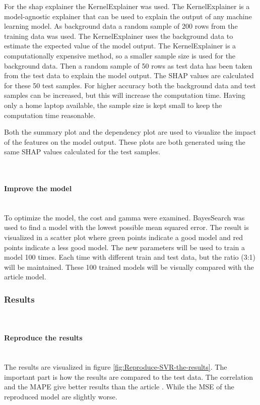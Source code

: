 \documentclass{article}
\newcommand{\subsubsubsection}[1]{%
  \paragraph{#1}\mbox{}\\}
\begin{document}
For the shap explainer the KernelExplainer was used.
The KernelExplainer is a model-agnostic explainer that can be used to explain the output of any machine learning model.
As background data a random sample of 200 rows from the training data was used.
The KernelExplainer uses the background data to estimate the expected value of the model output.
The KernelExplainer is a computationally expensive method, so a smaller sample size is used for the background data.
Then a random sample of 50 rows as test data has been taken from the test data to explain the model output.
The SHAP values are calculated for these 50 test samples.
For higher accuracy both the background data and test samples can be increased, but this will increase the computation time.
Having only a home laptop available, the sample size is kept small to keep the computation time reasonable.

Both the summary plot and the dependency plot are used to visualize the impact of the features on the model output.
These plots are both generated using the same SHAP values calculated for the test samples.

\subsubsubsection{Improve the model}
To optimize the model, the cost and gamma were examined. BayesSearch was used to find a model with the lowest possible mean squared error. The result is visualized in a scatter plot where green points indicate a good model and red points indicate a less good model.
The new parameters will be used to train a model 100 times. Each time with different train and test data, but the ratio (3:1) will be maintained. These 100 trained models will be visually compared with the article \cite{dahal2021prediction} model.

\subsubsection{Results}

\subsubsubsection{Reproduce the results}

The results are visualized in figure \ref{fig:Reproduce-SVR-the-results}. The important part is how the results are compared to the test data. The correlation and the MAPE give better results than the article \cite{dahal2021prediction}. While the MSE of the reproduced model are slightly worse.
\end{document}
